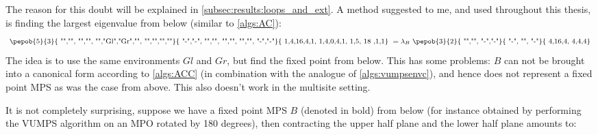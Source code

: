 The reason for this doubt will be explained in \cref{subsec:results:loops_and_ext}. A method suggested to me, and used throughout this thesis, is finding the largest eigenvalue from below (similar to \cref{algs:AC}):
\begin{equation}
    \vcenter{ \hbox{   \pepob{5}{3}{{
                        "","", "","",
                        "","Gl","Gr","",
                        "","","",""}}{{
                        "-","-",
                        "","",
                        "","",
                        "","",
                        "-","-"}}{{
                        1,4,16,4,1,
                        1,4,0,4,1,
                        1,5, 18  ,1,1}} }}  = \lambda_B   \vcenter{ \hbox{  \pepob{3}{2}{{
                        "","",
                        "-","-"}}{{
                        "-",
                        "",
                        "-"}}{{
                        4,16,4,
                        4,4,4}} }}
\end{equation}
The idea is to use the same environments $Gl$ and $Gr$, but find the fixed point from below. This has some problems: $B$ can not be brought into a canonical form according to \cref{algs:ACC} (in combination with the analogue of \cref{algs:vumpsenvc}), and hence does not represent a fixed point MPS as was the case from above. This also doesn't work in the multisite setting.

It is not completely surprising, suppose we have a fixed point MPS $B$ (denoted in bold) from below (for instance obtained by performing the VUMPS algorithm on an MPO rotated by 180 degrees), then contracting the upper half plane and the lower half plane amounts to:


